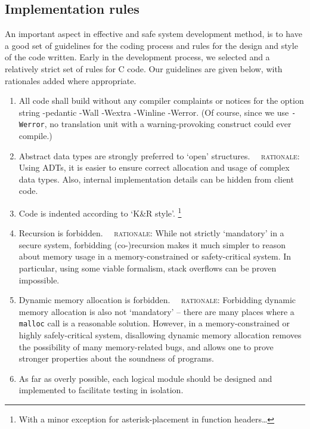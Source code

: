 \documentclass[a4paper,9pt]{article}
\begin{document}
\subsection{Implementation rules}
An important aspect in effective and safe system development method, is to
have a good set of guidelines for the coding process and rules for the design
and style of the code written.  Early in the development process, we selected
and a relatively strict set of rules for C code. Our guidelines are given
below, with rationales added where appropriate. 
{
\begin{enumerate}
    \item All code shall build without any compiler complaints or notices for
    the option string {\ttfamily -pedantic -Wall -Wextra -Winline -Werror}.
    (Of course, since we use \texttt{-Werror}, no translation unit with a
    warning-provoking construct could ever compile.)

    \item Abstract data types are strongly preferred
    to `open' structures. \textsc{~~rationale:} Using ADTs, it is easier to
    ensure correct allocation and usage of complex data types. Also, internal
    implementation details can be hidden from client code.

    \item Code is indented according to `K\&R style'. \footnote{With a minor
        exception for asterisk-placement in function headers\ldots}

    \item Recursion is forbidden. \textsc{~~rationale:} While not strictly
    `mandatory' in a secure system, forbidding (co-)recursion makes it much
    simpler to reason about memory usage in a memory-constrained
    or safety-critical system. In particular, using some viable
    formalism, stack overflows can be proven impossible.

    \item Dynamic memory allocation is forbidden. \textsc{~~rationale:} 
    Forbidding dynamic memory allocation is also not `mandatory' -- there are
    many places where a \texttt{malloc} call is a reasonable solution.
    However, in a memory-constrained or highly safely-critical system,
    disallowing dynamic memory allocation removes the possibility of many
    memory-related bugs, and allows one to prove stronger properties about the
    soundness of programs.

    \item As far as overly possible, each logical module should be designed
    and implemented to facilitate testing in isolation.


\end{enumerate}}
\end{document}
